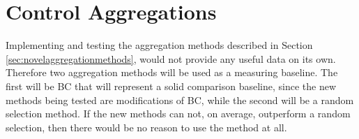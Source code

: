 \section{Control Aggregations}
Implementing and testing the aggregation methods described in Section \ref{sec:novelaggregationmethods}, would not provide any useful data on its own. Therefore two aggregation methods will be used as a measuring baseline. The first will be BC that will represent a solid comparison baseline, since the new methods being tested are modifications of BC, while the second will be a random selection method. If the new methods can not, on average, outperform a random selection, then there would be no reason to use the method at all.